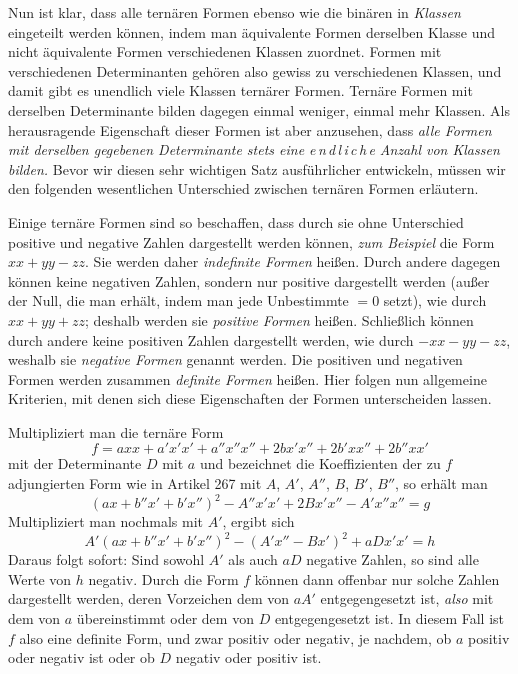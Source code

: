 Nun ist klar, dass alle ternären Formen ebenso wie die binären in \textit{Klassen} eingeteilt werden können, indem man äquivalente Formen derselben Klasse und nicht äquivalente Formen verschiedenen Klassen zuordnet. Formen mit verschiedenen Determinanten gehören also gewiss zu verschiedenen Klassen, und damit gibt es unendlich viele Klassen ternärer Formen. Ternäre Formen mit derselben Determinante bilden dagegen einmal weniger, einmal mehr Klassen. Als herausragende Eigenschaft dieser Formen ist aber anzusehen, dass \textit{alle Formen mit derselben gegebenen Determinante stets eine e\,n\,d\,l\,i\,c\,h\,e Anzahl von Klassen bilden.} Bevor wir diesen sehr wichtigen Satz ausführlicher entwickeln, müssen wir den folgenden wesentlichen Unterschied zwischen ternären Formen erläutern.

Einige ternäre Formen sind so beschaffen, dass durch sie ohne Unterschied positive und negative Zahlen dargestellt werden können, \textit{zum Beispiel} die Form $xx+yy-zz$. Sie werden daher \textit{indefinite Formen} heißen. Durch andere dagegen können keine negativen Zahlen, sondern nur positive dargestellt werden (außer der Null, die man erhält, indem man jede Unbestimmte $=0$ setzt), wie durch $xx+yy+zz$; deshalb werden sie \textit{positive Formen} heißen. Schließlich können durch andere keine positiven Zahlen dargestellt werden, wie durch $-xx-yy-zz$, weshalb sie \textit{negative Formen} genannt werden. Die positiven und negativen Formen werden zusammen \textit{definite Formen} heißen. Hier folgen nun allgemeine Kriterien, mit denen sich diese Eigenschaften der Formen unterscheiden lassen.

Multipliziert man die ternäre Form
\[
f=axx+a'x'x'+a''x''x''+2bx'x''+2b'xx''+2b''xx'
\]
mit der Determinante $D$ mit $a$ und bezeichnet die Koeffizienten der zu $f$ adjungierten Form wie in Artikel 267 mit $A$, $A'$, $A''$, $B$, $B'$, $B''$, so erhält man
\[
(ax+b''x'+b'x'')^2-A''x'x'+2Bx'x''-A'x''x''=g
\]
Multipliziert man nochmals mit $A'$, ergibt sich
\[
A'(ax+b''x'+b'x'')^2-(A'x''-Bx')^2+aDx'x'=h
\]
Daraus folgt sofort: Sind sowohl $A'$ als auch $aD$ negative Zahlen, so sind alle Werte von $h$ negativ. Durch die Form $f$ können dann offenbar nur solche Zahlen dargestellt werden, deren Vorzeichen dem von $aA'$ entgegengesetzt ist, \textit{also} mit dem von $a$ übereinstimmt oder dem von $D$ entgegengesetzt ist. In diesem Fall ist $f$ also eine definite Form, und zwar positiv oder negativ, je nachdem, ob $a$ positiv oder negativ ist oder ob $D$ negativ oder positiv ist.

